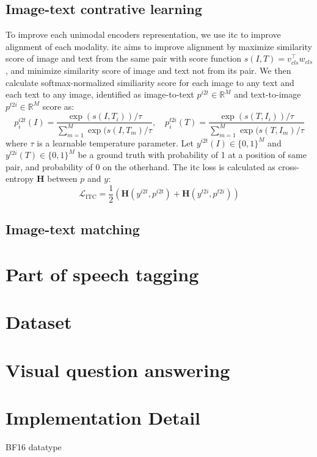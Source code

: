 \subsection{Image-text contrative learning}
To improve each unimodal encoders representation, we use \acrshort{itc} to improve alignment of each modality.
\acrshort{itc} aims to improve alignment by maximize similarity score of image and text from the same pair with score function \(s(I, T) = v_{cls}^\top w_{cls}\), and minimize similarity score of image and text not from its pair.
We then calculate softmax-normalized similiarity score for each image to any text and each text to any image, identified as image-to-text \(p^{i2t} \in \mathbb{R}^{M}\) and text-to-image \(p^{t2i} \in \mathbb{R}^{M}\) score as:
\[
    p^{i2t}_i(I) = \frac{ \exp{(s(I,T_i))/\tau} }{ \sum_{m=1}^{M}\exp{(s(I,T_m)/\tau} }, \quad p^{t2i}_i(T) = \frac{ \exp{(s(T,I_i))/\tau} }{ \sum_{m=1}^{M}\exp{(s(T,I_m)/\tau} }
\]
where \(\tau\) is a learnable temperature parameter. Let \( y^{i2t}(I) \in \{0,1\}^M \) and \( y^{t2i}(T) \in \{0,1\}^M \) be a ground truth with probability of 1 at a position of same pair, and probability of 0 on the otherhand.
The \acrshort{itc} loss is calculated as cross-entropy \(\mathbf{H}\) between \(p\) and \(y\):
\[
    \mathcal{L}_{\text{ITC}} = \frac{1}{2}(\mathbf{H}(y^{i2t},p^{i2t}) + \mathbf{H}(y^{t2i},p^{t2i}))
\]
\subsection{Image-text matching}
\section{Part of speech tagging}


\section{Dataset}


\section{Visual question answering}


\section{Implementation Detail}
BF16 datatype